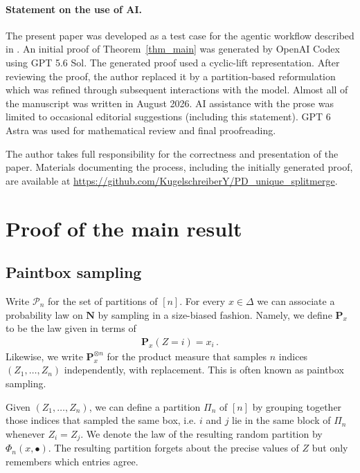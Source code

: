 \documentclass[a4paper,11pt]{article}
\newcommand{\NN}{\mathbf{N}}
\numberwithin{equation}{section}
\begin{document}
\paragraph{Statement on the use of AI.}
The present paper was developed as a test case for the agentic workflow
described in \cite{xu2026agents}. An initial proof of
Theorem~\ref{thm_main} was generated by OpenAI Codex using GPT 5.6 Sol. The generated proof used a cyclic-lift representation. 
After reviewing the proof, the author replaced it by a partition-based reformulation
which was refined through subsequent interactions with the model. 
Almost all of the manuscript was written in August 2026.
AI assistance with the prose was limited to occasional
editorial suggestions (including this statement). GPT 6 Astra was used for mathematical review and final proofreading. 

The author takes full
responsibility for the correctness and presentation of the paper. 
Materials documenting the process, including the initially generated proof, are
available at \url{https://github.com/KugelschreiberY/PD_unique_splitmerge}.


\section{Proof of the main result}

\subsection{Paintbox sampling}\label{sec_paintbox_def}
Write $\mathcal P_n$ for the set of partitions of $[n]$.
For every $ x \in \Delta $ we can associate a probability law on $ \NN$ by sampling in a size-biased fashion. Namely, we define $ \mathbf{P}_{x}$ to be the law given in terms of
\begin{equation*}
\begin{aligned}
\mathbf{P}_{x}( Z = i )= x_{i}\,.
\end{aligned}
\end{equation*}
Likewise, we write $ \mathbf{P}^{\otimes n}_{x}$ for the product measure that samples $n$  indices $ ( Z_{1}, \ldots, Z_{n})$ independently, with replacement. This is often known as paintbox sampling.

Given $ ( Z_{1}, \ldots, Z_{n})$, we can define a partition $ \Pi_{n}$ of $ [n]$ by grouping together those indices that sampled the same box, i.e. $ i $ and $j$ lie in the same block of $ \Pi_{n}$ whenever $ Z_{i}= Z_{j}$. We denote the law of the resulting random partition by $ \Phi_{n}( x, \bullet)$.
The resulting partition forgets about the precise values of $Z$ but only remembers which entries agree.
\end{document}
